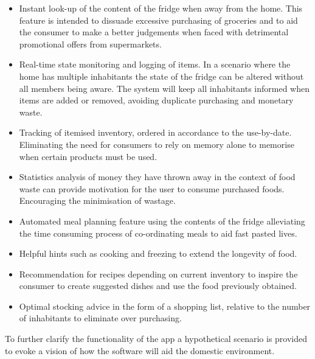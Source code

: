 \documentclass[a4paper, 11pt]{article}
\begin{document}
\begin{itemize}
  \item Instant look-up of the content of the fridge when away from the home. This feature is intended to dissuade excessive purchasing of groceries and to aid the consumer to make a better judgements when faced with detrimental promotional offers from supermarkets.
  
  \item Real-time state monitoring and logging of items. In a scenario where the home has multiple inhabitants the state of the fridge can be altered without all members being aware. The system will keep all inhabitants informed when items are added or removed, avoiding duplicate purchasing and monetary waste.
  
  \item Tracking of itemised inventory, ordered in accordance to the use-by-date. Eliminating the need for consumers to rely on memory alone to memorise when certain products must be used.
  
  \item Statistics analysis of money they have thrown away in the context of food waste can provide motivation for the user to consume purchased foods. Encouraging the minimisation of wastage.
   
   \item Automated meal planning feature using the contents of the fridge alleviating the time consuming process of co-ordinating meals to aid fast pasted lives.
    
   \item Helpful hints such as cooking and freezing to extend the longevity of food. 
   
   \item Recommendation for recipes depending on current inventory to inspire the consumer to create suggested dishes and use the food previously obtained. 

   \item Optimal stocking advice in the form of a shopping list, relative to the number of inhabitants to eliminate over purchasing. 
\end{itemize}

To further clarify the functionality of the app a hypothetical scenario is provided to evoke a vision of how the software will aid the domestic environment. 
\end{document}
